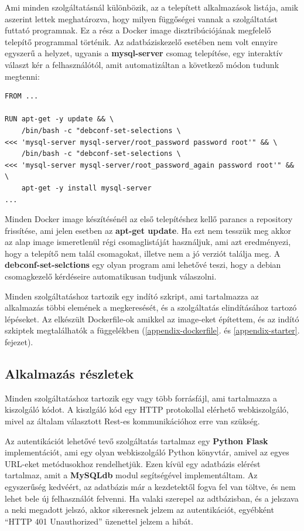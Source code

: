 \documentclass[11pt,magyar,a4paper,twoside,]{report}
\begin{document}
Ami minden szolgáltatásnál különbözik, az a telepített alkalmazások
listája, amik aszerint lettek meghatározva, hogy milyen függőségei
vannak a szolgáltatást futtató programnak. Ez a rész a Docker image
disztribúciójának megfelelő telepítő programmal történik. Az
adatbáziskezelő esetében nem volt ennyire egyszerű a helyzet, ugyanis a
\textbf{mysql-server} csomag telepítése, egy interaktív választ kér a
felhasználótól, amit automatizáltan a következő módon tudunk megtenni:

\begin{verbatim}
FROM ...

RUN apt-get -y update && \
    /bin/bash -c "debconf-set-selections \
<<< 'mysql-server mysql-server/root_password password root'" && \
    /bin/bash -c "debconf-set-selections \
<<< 'mysql-server mysql-server/root_password_again password root'" && \
    apt-get -y install mysql-server
...
\end{verbatim}

Minden Docker image készítésénél az első telepítéshez kellő parancs a
repository frissítése, ami jelen esetben az \textbf{apt-get update}. Ha
ezt nem tesszük meg akkor az alap image ismeretlenül régi csomaglistáját
használjuk, ami azt eredményezi, hogy a telepítő nem talál csomagokat,
illetve nem a jó verziót találja meg. A \textbf{debconf-set-selctions}
egy olyan program ami lehetővé teszi, hogy a debian csomagkezelő
kérdéseire automatikusan tudjunk válaszolni.

Minden szolgáltatáshoz tartozik egy indító szkript, ami tartalmazza az
alkalmazás többi elemének a megkeresését, és a szolgáltatás
elindításához tartozó lépéseket. Az elkészült Dockerfile-ok amikkel az
image-eket építettem, és az indító szkiptek megtalálhatók a függelékben
(\ref{appendix-dockerfile}. és \ref{appendix-starter}. fejezet).

\subsection{Alkalmazás részletek}\label{alkalmazuxe1s-ruxe9szletek}

Minden szolgáltatáshoz tartozik egy vagy több forrásfájl, ami
tartalmazza a kiszolgáló kódot. A kiszlgáló kód egy HTTP protokollal
elérhető webkiszolgáló, mivel az általam választott Rest-es
kommunikációhoz erre van szükség.

Az autentikációt lehetővé tevő szolgáltatás tartalmaz egy \textbf{Python
Flask} implementációt, ami egy olyan webkiszolgáló Python könyvtár,
amivel az egyes URL-eket metódusokhoz rendelhetjük. Ezen kívül egy
adatbázis elérést tartalmaz, amit a \textbf{MySQLdb} modul segítségével
implementáltam. Az egyszerűség kedvéért, az adatbázis már a kezdetektől
fogva fel van töltve, és nem lehet bele új felhasználót felvenni. Ha
valaki szerepel az adtbázisban, és a jelszava a neki megadott jelszó,
akkor sikeresnek jelzem az autentikációt, egyébként ``HTTP 401
Unauthorized'' üzenettel jelzem a hibát.
\end{document}
